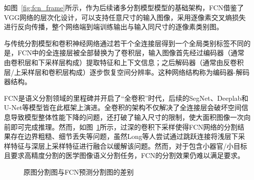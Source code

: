 如图~\ref{fig:fcn_frame}所示，作为后续诸多分割模型模型的基础架构，FCN借鉴了VGG网络的层次化设计，可以支持任意尺寸的输入图像，采用逐像素交叉熵损失进行反向传播，整个网络端到端训练输出与输入同尺寸的逐像素类别图。

与传统分割模型和卷积神经网络通过若干个全连接层得到一个全局类别标签不同的是，FCN中的全连接层被全部替换为了卷积层，输入图像首先经过编码器（通常由卷积层和下采样层构成）提取特征和上下文信息；之后解码器（通常由反卷积层/上采样层和卷积层构成）逐步恢复空间分辨率。这种网络结构称为编码器-解码器结构。

FCN是语义分割领域的里程碑并开启了“全卷积”时代，后续的SegNet、Deeplab和U-Net等模型皆在此框架上演进。全卷积的架构不仅解决了全连接层会破坏空间信息导致模型整体性能下降的问题，还打破了输入尺寸的限制，使大面积图像一次向前即可完成推理。然而，如图~\ref{fig:fcn_pre}所示，过深的卷积下采样使得FCN网络的分割结果存在边界粗糙、细节丢失等问题，虽然Long等人\cite{shelhamer2016}尝试通过跳跃连接将浅层下采样特征与深层上采样特征进行融合以缓解该问题。然而，对于包含小器官/小目标且要求高精度分割的医学图像语义分割任务，FCN的分割效果仍难以满足要求。

\begin{figure}[htbp]
    \centering
    \hspace{1cm}
    \hspace{1cm}
    \caption{原图分割图与FCN预测分割图的差别\cite{shelhamer2016}}
    \label{fig:fcn_pre}
\end{figure}

